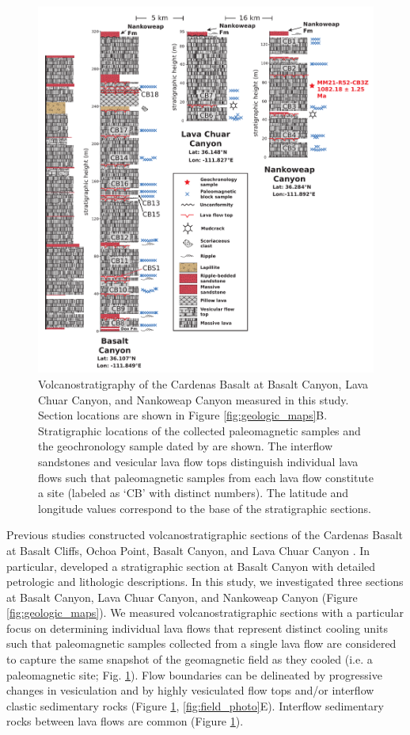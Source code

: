 \documentclass[draft]{agujournal2019}
\begin{document}
\begin{figure}[h!]
\centering
\includegraphics[width=\textwidth]{Cardenas_strat_uniform_scale.pdf}
\caption{Volcanostratigraphy of the Cardenas Basalt at Basalt Canyon, Lava Chuar Canyon, and Nankoweap Canyon measured in this study. Section locations are shown in Figure \ref{fig:geologic_maps}B. Stratigraphic locations of the collected paleomagnetic samples and the geochronology sample dated by  are shown. The interflow sandstones and vesicular lava flow tops distinguish individual lava flows such that paleomagnetic samples from each lava flow constitute a site (labeled as `CB' with distinct numbers). The latitude and longitude values correspond to the base of the stratigraphic sections.}
\label{fig:cardenas_strat}
\end{figure}

Previous studies constructed volcanostratigraphic sections of the Cardenas Basalt at Basalt Cliffs, Ochoa Point, Basalt Canyon, and Lava Chuar Canyon \cite{Lucchitta1983a, Hendricks1989a}. In particular,  developed a stratigraphic section at Basalt Canyon with detailed petrologic and lithologic descriptions. In this study, we investigated three sections at Basalt Canyon, Lava Chuar Canyon, and Nankoweap Canyon (Figure \ref{fig:geologic_maps}). We measured volcanostratigraphic sections with a particular focus on determining individual lava flows that represent distinct cooling units such that paleomagnetic samples collected from a single lava flow are considered to capture the same snapshot of the geomagnetic field as they cooled (i.e. a paleomagnetic site; Fig. \ref{fig:cardenas_strat}). Flow boundaries can be delineated by progressive changes in vesiculation and by highly vesiculated flow tops and/or interflow clastic sedimentary rocks (Figure \ref{fig:cardenas_strat}, \ref{fig:field_photo}E). Interflow sedimentary rocks between lava flows are common (Figure \ref{fig:cardenas_strat}).
\end{document}
